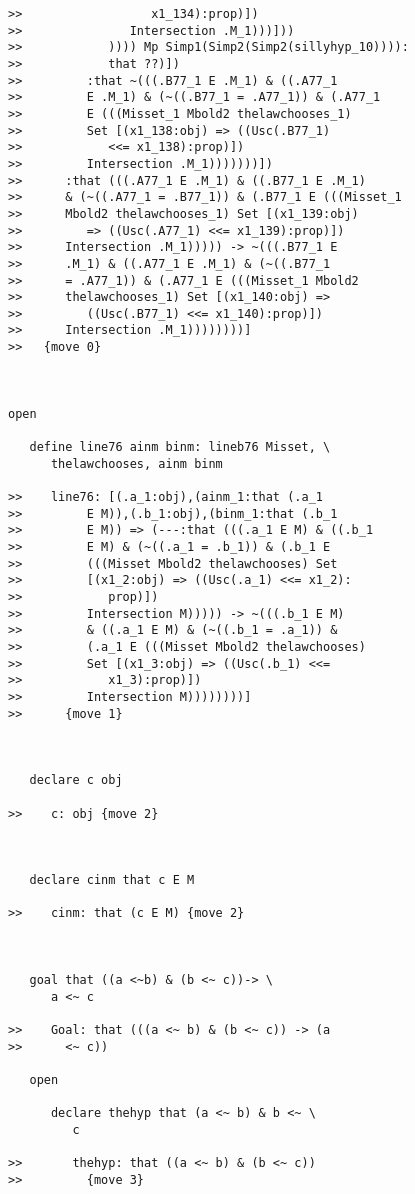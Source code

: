 \documentclass[12pt]{article}
\begin{document}
\begin{verbatim}
>>                  x1_134):prop)])
>>               Intersection .M_1)))]))
>>            )))) Mp Simp1(Simp2(Simp2(sillyhyp_10)))):
>>            that ??)])
>>         :that ~(((.B77_1 E .M_1) & ((.A77_1
>>         E .M_1) & (~((.B77_1 = .A77_1)) & (.A77_1
>>         E (((Misset_1 Mbold2 thelawchooses_1)
>>         Set [(x1_138:obj) => ((Usc(.B77_1)
>>            <<= x1_138):prop)])
>>         Intersection .M_1)))))))])
>>      :that (((.A77_1 E .M_1) & ((.B77_1 E .M_1)
>>      & (~((.A77_1 = .B77_1)) & (.B77_1 E (((Misset_1
>>      Mbold2 thelawchooses_1) Set [(x1_139:obj)
>>         => ((Usc(.A77_1) <<= x1_139):prop)])
>>      Intersection .M_1))))) -> ~(((.B77_1 E
>>      .M_1) & ((.A77_1 E .M_1) & (~((.B77_1
>>      = .A77_1)) & (.A77_1 E (((Misset_1 Mbold2
>>      thelawchooses_1) Set [(x1_140:obj) =>
>>         ((Usc(.B77_1) <<= x1_140):prop)])
>>      Intersection .M_1))))))))]
>>   {move 0}



open

   define line76 ainm binm: lineb76 Misset, \
      thelawchooses, ainm binm

>>    line76: [(.a_1:obj),(ainm_1:that (.a_1
>>         E M)),(.b_1:obj),(binm_1:that (.b_1
>>         E M)) => (---:that (((.a_1 E M) & ((.b_1
>>         E M) & (~((.a_1 = .b_1)) & (.b_1 E
>>         (((Misset Mbold2 thelawchooses) Set
>>         [(x1_2:obj) => ((Usc(.a_1) <<= x1_2):
>>            prop)])
>>         Intersection M))))) -> ~(((.b_1 E M)
>>         & ((.a_1 E M) & (~((.b_1 = .a_1)) &
>>         (.a_1 E (((Misset Mbold2 thelawchooses)
>>         Set [(x1_3:obj) => ((Usc(.b_1) <<=
>>            x1_3):prop)])
>>         Intersection M))))))))]
>>      {move 1}



   declare c obj

>>    c: obj {move 2}



   declare cinm that c E M

>>    cinm: that (c E M) {move 2}



   goal that ((a <~b) & (b <~ c))-> \
      a <~ c

>>    Goal: that (((a <~ b) & (b <~ c)) -> (a
>>      <~ c))

   open

      declare thehyp that (a <~ b) & b <~ \
         c

>>       thehyp: that ((a <~ b) & (b <~ c))
>>         {move 3}




\end{verbatim}
\end{document}
